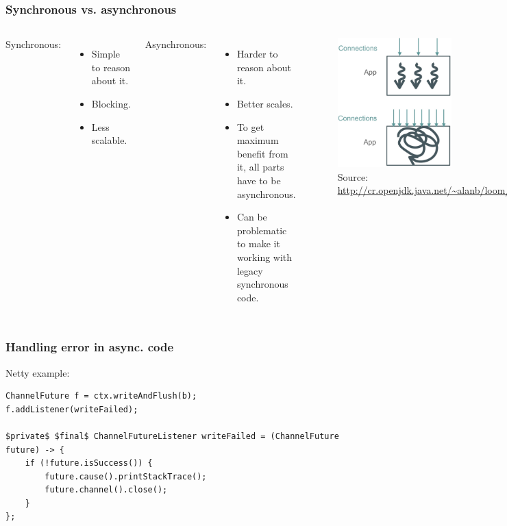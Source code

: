 \documentclass[10pt,utf8]{beamer}
\begin{document}
\begin{frame}
  \frametitle{Synchronous vs. asynchronous}
  \begin{columns}
            Synchronous:
            \begin{itemize}
                \item Simple to reason about it.
                \item Blocking.
                \item Less scalable.
            \end{itemize}
            
            \vspace{0.5cm}
            
            Asynchronous:
            \begin{itemize}
                \item Harder to reason about it.
                \item Better scales.
                \item To get maximum benefit from it, all parts have to be asynchronous.
                \item Can be problematic to make it working with legacy synchronous code.
            \end{itemize}
            
            \begin{figure}
                \centering
                \includegraphics[height=5cm]{./img/sync_vs_async.eps}
                \caption{\tiny{Source: \url{http://cr.openjdk.java.net/~alanb/loom/Devoxx2018.pdf}}}
            \end{figure}
    \end{columns}
\end{frame}

\begin{frame}[fragile]
    \frametitle{Handling error in async. code}
Netty example:
    \begin{lstlisting}[style=java]
ChannelFuture f = ctx.writeAndFlush(b);
f.addListener(writeFailed);

$private$ $final$ ChannelFutureListener writeFailed = (ChannelFuture future) -> {
    if (!future.isSuccess()) {
        future.cause().printStackTrace();
        future.channel().close();
    }
};
    \end{lstlisting}
\end{frame}
\end{document}
